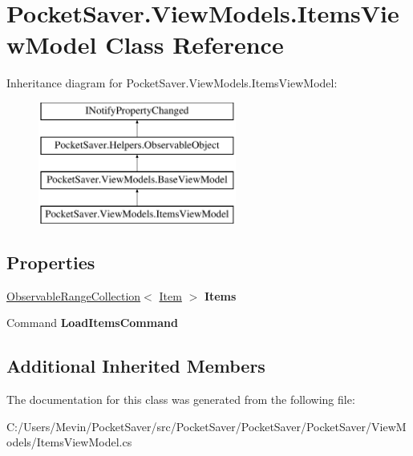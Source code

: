 \hypertarget{class_pocket_saver_1_1_view_models_1_1_items_view_model}{}\section{Pocket\+Saver.\+View\+Models.\+Items\+View\+Model Class Reference}
\label{class_pocket_saver_1_1_view_models_1_1_items_view_model}
Inheritance diagram for Pocket\+Saver.\+View\+Models.\+Items\+View\+Model\+:\begin{figure}[H]
\begin{center}
\leavevmode
\includegraphics[height=4.000000cm]{class_pocket_saver_1_1_view_models_1_1_items_view_model}
\end{center}
\end{figure}
\subsection*{Properties}
\begin{DoxyCompactItemize}
\item 
\mbox{\label{class_pocket_saver_1_1_view_models_1_1_items_view_model_a617da1e419ddadb0a751d66a7ba0822f}} 
\hyperlink{class_pocket_saver_1_1_helpers_1_1_observable_range_collection}{Observable\+Range\+Collection}$<$ \hyperlink{class_pocket_saver_1_1_models_1_1_item}{Item} $>$ {\bfseries Items}
\item 
\mbox{\label{class_pocket_saver_1_1_view_models_1_1_items_view_model_af0317819948c9e0306beb71aadab21be}} 
Command {\bfseries Load\+Items\+Command}
\end{DoxyCompactItemize}
\subsection*{Additional Inherited Members}


The documentation for this class was generated from the following file\+:\begin{DoxyCompactItemize}
\item 
C\+:/\+Users/\+Mevin/\+Pocket\+Saver/src/\+Pocket\+Saver/\+Pocket\+Saver/\+Pocket\+Saver/\+View\+Models/Items\+View\+Model.\+cs\end{DoxyCompactItemize}
